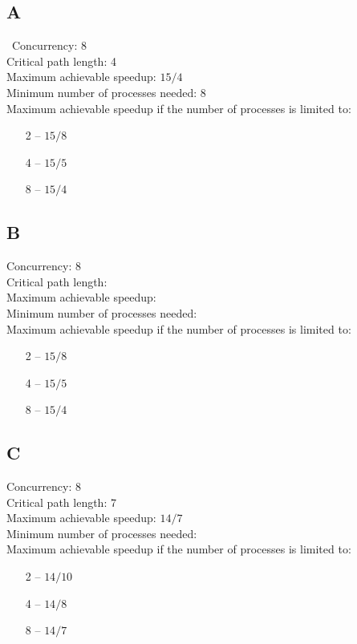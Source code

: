 \documentclass[12pt]{article}
\begin{document}
    \subsection*{A}\
    \noindent Concurrency: 8\\
    Critical path length: 4\\
    Maximum achievable speedup: \(15/4\) \\
    Minimum number of processes needed: 8\\
    Maximum achievable speedup if the number of processes is limited to: 
    \begin{itemize}
        \item[2]-- \(15/8\)
        \item[4]-- \(15/5\)
        \item[8]-- \(15/4\)
    \end{itemize}
    \subsection*{B}
    Concurrency: 8\\
    Critical path length: \\
    Maximum achievable speedup: \\
    Minimum number of processes needed: \\
    Maximum achievable speedup if the number of processes is limited to:
    \begin{itemize}
        \item[2]-- \(15/8\)
        \item[4]-- \(15/5\)
        \item[8]-- \(15/4\)
    \end{itemize}
    \subsection*{C}
    Concurrency: 8\\
    Critical path length: 7\\
    Maximum achievable speedup: \(14/7\)\\
    Minimum number of processes needed: \\
    Maximum achievable speedup if the number of processes is limited to:
    \begin{itemize}
        \item[2]-- \(14/10\)
        \item[4]-- \(14/8\)
        \item[8]-- \(14/7\)  
    \end{itemize}
\end{document}
